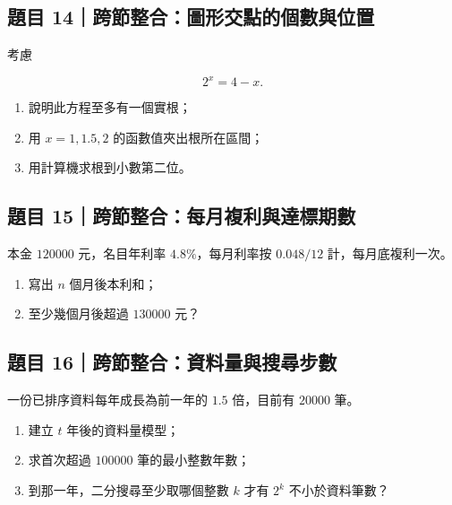 \documentclass[11pt,a4paper]{article}
\providecommand{\tightlist}{%
  \setlength{\itemsep}{0pt}\setlength{\parskip}{0pt}}
\begin{document}
\subsection{題目 14｜跨節整合：圖形交點的個數與位置}\label{ux984cux76ee-14ux8de8ux7bc0ux6574ux5408ux5716ux5f62ux4ea4ux9edeux7684ux500bux6578ux8207ux4f4dux7f6e}

考慮

\[
2^x=4-x.
\]

\begin{enumerate}
\def\labelenumi{\arabic{enumi}.}
\tightlist
\item
  說明此方程至多有一個實根；
\item
  用 \(x=1,1.5,2\) 的函數值夾出根所在區間；
\item
  用計算機求根到小數第二位。
\end{enumerate}

\subsection{題目 15｜跨節整合：每月複利與達標期數}\label{ux984cux76ee-15ux8de8ux7bc0ux6574ux5408ux6bcfux6708ux8907ux5229ux8207ux9054ux6a19ux671fux6578}

本金 \(120000\) 元，名目年利率 \(4.8\%\)，每月利率按 \(0.048/12\) 計，每月底複利一次。

\begin{enumerate}
\def\labelenumi{\arabic{enumi}.}
\tightlist
\item
  寫出 \(n\) 個月後本利和；
\item
  至少幾個月後超過 \(130000\) 元？
\end{enumerate}

\subsection{題目 16｜跨節整合：資料量與搜尋步數}\label{ux984cux76ee-16ux8de8ux7bc0ux6574ux5408ux8cc7ux6599ux91cfux8207ux641cux5c0bux6b65ux6578}

一份已排序資料每年成長為前一年的 \(1.5\) 倍，目前有 \(20000\) 筆。

\begin{enumerate}
\def\labelenumi{\arabic{enumi}.}
\tightlist
\item
  建立 \(t\) 年後的資料量模型；
\item
  求首次超過 \(100000\) 筆的最小整數年數；
\item
  到那一年，二分搜尋至少取哪個整數 \(k\) 才有 \(2^k\) 不小於資料筆數？
\end{enumerate}
\end{document}
